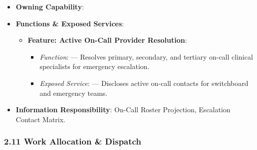 \begin{itemize}

\item 
\textbf{Owning Capability}: \texttt{}



\item 
\textbf{Functions \& Exposed Services}:


\begin{itemize}

\item 
\textbf{Feature: Active On-Call Provider Resolution}:


\begin{itemize}

\item 
\emph{Function}: \texttt{} — Resolves primary, secondary, and tertiary on-call clinical specialists for emergency escalation.



\item 
\emph{Exposed Service}: \texttt{} — Discloses active on-call contacts for switchboard and emergency teams.



\end{itemize}


\end{itemize}


\item 
\textbf{Information Responsibility}: On-Call Roster Projection, Escalation Contact Matrix.



\end{itemize}
\label{rad:hso:218}

\par\smallskip
{}\label{rad:hso:220}
\subsubsection*{2.11 Work Allocation \& Dispatch}
\label{rad:hso:221}

